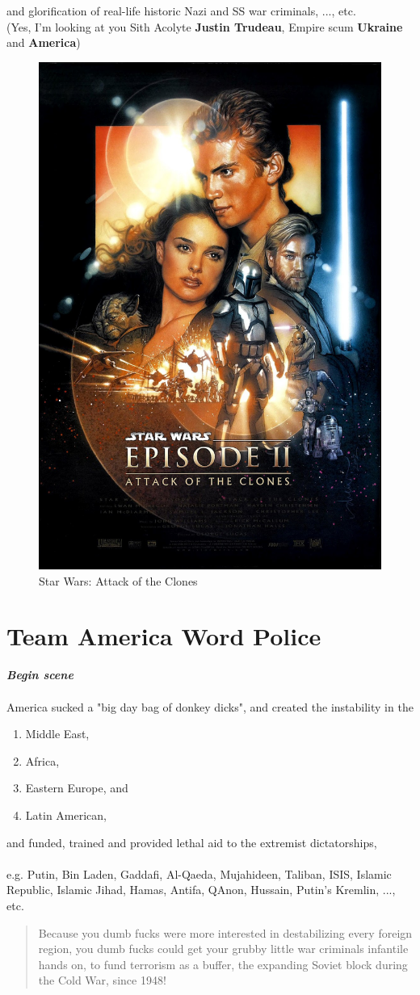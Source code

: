 \documentclass[16pt,openany,oneside]{book}
\begin{document}
\noindent and glorification of real-life historic Nazi and SS war criminals, ..., etc. \\ 
(Yes, I'm looking at you Sith Acolyte \textbf{Justin Trudeau}, Empire scum \textbf{Ukraine} and \textbf{America})

\begin{figure}[H]
    \centering
    \includegraphics[width=0.5\linewidth]{assets/star_wars/attack_of_the_clones.jpg}
    \caption{Star Wars: Attack of the Clones}
    \label{fig:attack-of-the-clones-poster}
\end{figure}

\chapter{Team America Word Police}

\textbf{\textit{Begin scene}}
\\\\
\noindent America sucked a "big day bag of donkey dicks", 
\noindent and created the instability in the 

\begin{enumerate}
    \item Middle East, 
    \item Africa, 
    \item Eastern Europe, and
    \item Latin American,
\end{enumerate}

\noindent and funded, trained and provided lethal aid to the extremist dictatorships, 
\\\\
e.g. Putin, 
Bin Laden, 
Gaddafi, 
Al-Qaeda, 
Mujahideen, 
Taliban,
ISIS, 
Islamic Republic,
 Islamic Jihad,
 Hamas, 
Antifa, 
QAnon,
 Hussain, 
Putin's Kremlin, ..., etc.
\begin{quote}
    Because you dumb fucks were more interested in destabilizing every foreign region, you dumb fucks could get your grubby little war criminals infantile hands on, to fund terrorism as a buffer, the expanding Soviet block during the Cold War, since 1948!
\end{quote}
\end{document}

